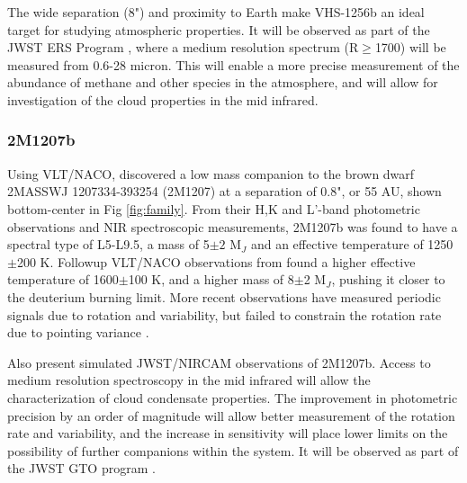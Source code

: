 The wide separation (8") and proximity to Earth make VHS-1256b an ideal target for studying atmospheric properties.
It will be observed as part of the JWST ERS Program \parencite{Hinkley2019}, where a medium resolution spectrum (R$\geq$1700) will be measured from 0.6-28 micron. 
This will enable a more precise measurement of the abundance of methane and other species in the atmosphere, and will allow for investigation of the cloud properties in the mid infrared.
\subsubsection{2M1207b}
Using VLT/NACO, \parencite{Chauvin2004} discovered a low mass companion to the brown dwarf 2MASSWJ 1207334-393254 (2M1207) at a separation of 0.8", or 55 AU, shown bottom-center in Fig \ref{fig:family}. 
From their H,K and L'-band photometric observations and NIR spectroscopic measurements, 2M1207b was found to have a spectral type of L5-L9.5, a mass of 5$\pm2$ M$_{J}$ and an effective temperature of 1250$\pm$200 K. Followup VLT/NACO observations from \parencite{Mohanty2007} found a higher effective temperature of 1600$\pm$100 K, and a higher mass of 8$\pm$2 M$_{J}$, pushing it closer to the deuterium burning limit. More recent observations have measured periodic signals due to rotation and variability, but failed to constrain the rotation rate due to pointing variance \parencite{Zhou2019}. 

\parencite{Zhou2019} Also present simulated JWST/NIRCAM observations of 2M1207b. Access to medium resolution spectroscopy in the mid infrared will allow the characterization of cloud condensate properties. 
The improvement in photometric precision by an order of magnitude will allow better measurement of the rotation rate and variability, and the increase in sensitivity will place lower limits on the possibility of further companions within the system.
It will be observed as part of the JWST GTO program \parencite{Birkmann2019}.

